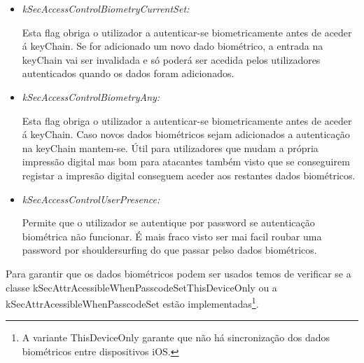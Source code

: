 \begin{itemize}

\item \textit{kSecAccessControlBiometryCurrentSet:}\par
	\hfill\par
	Esta flag obriga o utilizador a autenticar-se biometricamente antes de aceder á keyChain. Se for adicionado um novo dado biométrico, a entrada na keyChain vai ser invalidada e só poderá ser acedida pelos utilizadores autenticados quando os dados foram adicionados.\par
	\hfill\par

\item \textit{kSecAccessControlBiometryAny:}\par
	\hfill\par
	Esta flag obriga o utilizador a autenticar-se biometricamente antes de aceder á keyChain. Caso novos dados biométricos sejam adicionados a autenticação na keyChain mantem-se. Útil para utilizadores que mudam a própria impressão digital mas bom para atacantes também visto que se conseguirem registar a impresão digital conseguem aceder aos restantes dados biométricos.\par
	\hfill\par

\item \textit{kSecAccessControlUserPresence:}\par
	\hfill\par
	Permite que o utilizador se autentique por password se autenticação biométrica não funcionar. É mais fraco visto ser mai facil roubar uma password por shouldersurfing do que passar pelso dados biométricos.
\end{itemize}

Para garantir que os dados biométricos podem ser usados temos de verificar se a classe kSecAttrAcessibleWhenPasscodeSetThisDeviceOnly ou a kSecAttrAcessibleWhenPasscodeSet estão implementadas\footnote[5]{A variante ThisDeviceOnly garante que não há sincronização dos dados biométricos entre dispositivos iOS.}.\par
\hfill\par

